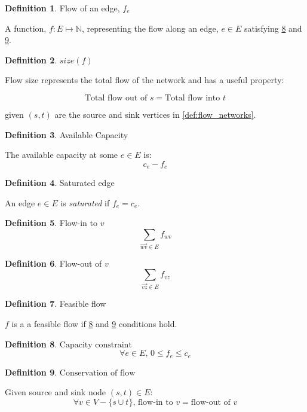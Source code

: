 \documentclass{article}
\theoremstyle{definition}
\newtheorem{definition}{Definition}[section]
\begin{document}
\begin{definition}{Flow of an edge, $f_e$}
\label{prop:flow_edge}
	
A function, $f:E \mapsto \mathbb{N}$, representing the flow along an edge, $e \in E$ satisfying \ref{prop:capacity} and \ref{prop:conservation}.
\end{definition}

\begin{definition}{$size(f)$}
\label{prop:size}
	
Flow size represents the total flow of the network and has a useful property:
	
$$\text{Total flow out of } s = \text{Total flow into } t$$
	
given $(s, t)$ are the source and sink vertices in \ref{def:flow_networks}.
\end{definition}

\begin{definition}{Available Capacity}
\label{def:available_cap}

The available capacity at some $e \in E$ is:
$$c_e - f_e$$
\end{definition}

\begin{definition}{Saturated edge}
\label{def:sat_edge}

An edge $e \in E$ is \textit{saturated} if $f_e = c_e$.
\end{definition}

\begin{definition}{Flow-in to $v$}
\label{def:flowin}
$$\sum_{\overrightarrow{wv} \in E}{f_{wv}}$$
\end{definition}

\begin{definition}{Flow-out of $v$}
\label{def:flowout}
$$\sum_{\overrightarrow{vz} \in E}{f_{vz}}$$
\end{definition}

\begin{definition}{Feasible flow}
	
	$f$ is a a feasible flow if \ref{prop:capacity} and \ref{prop:conservation} conditions hold.
\end{definition}

\begin{definition}{$\text{Capacity constraint}$}
\label{prop:capacity}
$$\forall e \in E, \, 0 \leq f_e \leq c_e$$
\end{definition}

\begin{definition}{$\text{Conservation of flow}$}
\label{prop:conservation}

Given source and sink node $(s,t) \in E$:
$$\forall v \in V - \{s \cup t\}, \, \text{flow-in to } v = \text{flow-out of } v$$ 
\end{definition}
\end{document}
